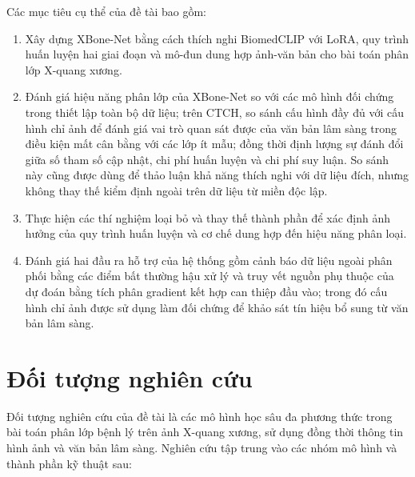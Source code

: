 Các mục tiêu cụ thể của đề tài bao gồm:
\begin{enumerate}
\item Xây dựng XBone-Net bằng cách thích nghi BiomedCLIP với LoRA, quy trình huấn luyện hai giai đoạn và mô-đun dung hợp ảnh-văn bản cho bài toán phân lớp X-quang xương.

\item Đánh giá hiệu năng phân lớp của XBone-Net so với các mô hình đối chứng trong thiết lập toàn bộ dữ liệu; trên CTCH, so sánh cấu hình đầy đủ với cấu hình chỉ ảnh để đánh giá vai trò quan sát được của văn bản lâm sàng trong điều kiện mất cân bằng với các lớp ít mẫu; đồng thời định lượng sự đánh đổi giữa số tham số cập nhật, chi phí huấn luyện và chi phí suy luận. So sánh này cũng được dùng để thảo luận khả năng thích nghi với dữ liệu đích, nhưng không thay thế kiểm định ngoài trên dữ liệu từ miền độc lập.

\item Thực hiện các thí nghiệm loại bỏ và thay thế thành phần để xác định ảnh hưởng của quy trình huấn luyện và cơ chế dung hợp đến hiệu năng phân loại.

\item Đánh giá hai đầu ra hỗ trợ của hệ thống gồm cảnh báo dữ liệu ngoài phân phối bằng các điểm bất thường hậu xử lý và truy vết nguồn phụ thuộc của dự đoán bằng tích phân gradient kết hợp can thiệp đầu vào; trong đó cấu hình chỉ ảnh được sử dụng làm đối chứng để khảo sát tín hiệu bổ sung từ văn bản lâm sàng.
\end{enumerate}

\section{Đối tượng nghiên cứu}

Đối tượng nghiên cứu của đề tài là các mô hình học sâu đa phương thức trong bài toán phân lớp bệnh lý trên ảnh X-quang xương, sử dụng đồng thời thông tin hình ảnh và văn bản lâm sàng. Nghiên cứu tập trung vào các nhóm mô hình và thành phần kỹ thuật sau:

